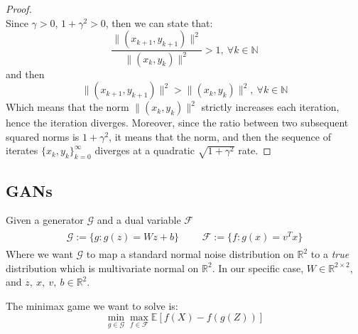 \documentclass[12pt]{article}
\begin{document}
\begin{proof}
\begin{equation*}
\end{equation*}
Since $\gamma > 0$, $1 + \gamma^{2} > 0$, then we can state that:
\begin{equation*}
    \frac{\lVert (x_{k+1}, y_{k+1}) \rVert ^ 2}{\lVert (x_{k}, y_{k}) \rVert ^{2}} > 1, \ \forall k \in \mathbb{N}
\end{equation*}
and then
\begin{equation}
    \lVert (x_{k+1}, y_{k+1}) \rVert ^ 2 > \lVert (x_{k}, y_{k}) \rVert ^{2}, \ \forall k \in \mathbb{N}
\end{equation}
Which means that the norm $\lVert (x_{k}, y_{k}) \rVert ^{2}$ strictly increases each iteration, hence the iteration diverges. Moreover, since the ratio between two subsequent squared norms is $1 + \gamma^{2}$, it means that the norm, and then the sequence of iterates $\{x_k, y_k\}^{\infty}_{k=0}$ diverges at a quadratic $\sqrt{1 + \gamma^{2}}$ rate.

\end{proof}

\subsection{GANs}

Given a generator $\mathcal{G}$ and a dual variable $\mathcal{F}$
\begin{align}
\begin{aligned} \label{def:gan_funct}
    \mathcal{G}:= \{ g : g(z) = Wz + b \} \ \ \ \ \ \ \  & \mathcal{F} := \{ f : g(x) = v^{T}x \}
\end{aligned}
\end{align}
Where we want $\mathcal{G}$ to map a standard normal noise distribution on $\mathbb{R}^{2}$ to a \emph{true} distribution which is multivariate normal on $\mathbb{R}^{2}$. In our specific case, $W \in \mathbb{R}^{2 \times 2}$, and $z,\ x,\ v,\ b \in \mathbb{R}^{2}$.

The minimax game we want to solve is:
\begin{equation}
    \min_{g \in \mathcal{G}} \max_{f \in \mathcal{F}} \mathbb{E}[f(X) - f(g(Z))]
\end{equation}
\end{document}
